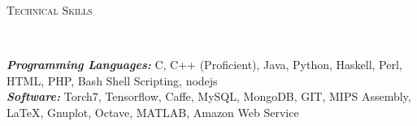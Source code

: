\documentclass[9pt]{article}
\newenvironment{changemargin}[2]{%
  \begin{list}{}{%
    \setlength{\topsep}{0pt}%
    \setlength{\leftmargin}{#1}%
    \setlength{\rightmargin}{#2}%
    \setlength{\listparindent}{\parindent}%
    \setlength{\itemindent}{\parindent}%
    \setlength{\parsep}{\parskip}%
  }%
  \item[]}{\end{list}
}
\newcommand{\lineover}{
	\begin{changemargin}{-0.05in}{-0.10in}
		\vspace*{-9pt}
		\hrulefill \\
		\vspace*{-2pt}
	\end{changemargin}
}
\newcommand{\header}[1]{
	\begin{changemargin}{-0.5in}{-0.5in}
		\scshape{#1}\\
  	\lineover
	\end{changemargin}
}
\newenvironment{body} {
	\vspace*{-16pt}
	\begin{changemargin}{-0.6in}{-0.65in}
  }	
	{\end{changemargin}
}
\begin{document}
\vspace{3 mm}
\header{Technical Skills}

\vspace{3 mm}
\begin{body}
	\vspace{14pt}
	\begin{changemargin}{0.15in}{0.15in}
	\emph{\textbf{Programming Languages: }}{} C, C++ (Proficient), Java, Python, Haskell, Perl, HTML, PHP, Bash Shell Scripting, nodejs\\
	\emph{\textbf{Software: }}{}  Torch7, Tensorflow, Caffe, MySQL, MongoDB, GIT, MIPS Assembly, \LaTeX, Gnuplot, Octave, MATLAB, Amazon Web Service \\
	\end{changemargin}
\end{body}
\end{document}
